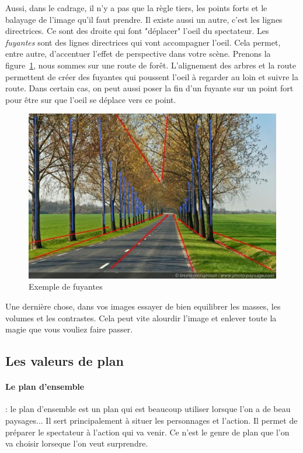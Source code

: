 \documentclass{article}
\begin{document}
Aussi, dans le cadrage, il n'y a pas que la règle tiers, les points forts et le balayage de l'image qu'il faut prendre. Il existe aussi un autre, c'est les lignes directrices. Ce sont des droite qui font "déplacer" l'oeil du spectateur. Les \textit{fuyantes} sont des lignes directrices qui vont accompagner l'oeil. Cela permet, entre autre, d'accentuer l'effet de perspective dans votre scène. Prenons la figure~\ref{fig:fuyante}, nous sommes sur une route de forêt. L'alignement des arbres et la route permettent de créer des fuyantes qui poussent l'oeil à regarder au loin et suivre la route. Dans certain cas, on peut aussi poser la fin d'un fuyante sur un point fort pour être sur que l'oeil se déplace vers ce point. 

\begin{figure}[h]
\centering
\includegraphics[scale=0.3]{img/image2.jpg}
\caption{Exemple de fuyantes}
\label{fig:fuyante}
\end{figure}

\smallskip

Une dernière chose, dans vos images essayer de bien equilibrer les masses, les volumes et les contrastes. Cela peut vite alourdir l'image et enlever toute la magie que vous vouliez faire passer.
\clearpage
	\subsection{Les valeurs de plan}
	\paragraph{Le plan d'ensemble}: le plan d'ensemble est un plan qui est beaucoup utiliser lorsque l'on a de beau paysages... Il sert principalement à situer les personnages et l'action. Il permet de préparer le spectateur à l'action qui va venir. Ce n'est le genre de plan que l'on va choisir lorseque l'on veut surprendre. 
	
\end{document}
